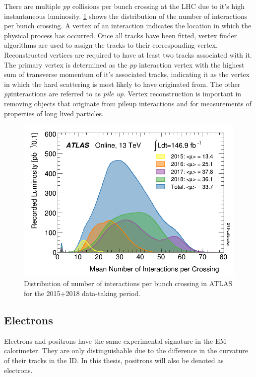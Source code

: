 There are multiple \emph{pp} collisions per bunch crossing at the LHC due to it's high instantaneous luminosity. \cref{fig:method:ATLAS-pileup} shows the distribution of the number of interactions per bunch crossing. A vertex of an interaction indicates the location in which the physical process has occurred. Once all tracks have been fitted, vertex finder algorithms are used to assign the tracks to their corresponding vertex. Reconstructed vertices are required to have at least two tracks associated with it. The primary vertex is determined as the \emph{pp} interaction vertex with the highest sum of transverse momentum of it's associated tracks, indicating it as the vertex in which the hard scattering is most likely to have originated from. The other \emph{pp}interactions are referred to as \emph{pile up}. Vertex reconstruction is important in removing objects that originate from pileup interactions and for measurements of properties of long lived particles.  
\begin{figure}[]
    \centering
    \includegraphics[width=\mediumfigwidth]{images/mu_2015_2018.png}
    \caption[Distribution of number of interactions per \protonproton bunch crossing in ATLAS for the 2015+2018 data-taking period]{Distribution of number of interactions per \protonproton bunch crossing in ATLAS for the 2015+2018 data-taking period.~\cite{ATLAS:lumiPlots}}
    \label{fig:method:ATLAS-pileup}
\end{figure}

\subsection{Electrons}\label{sec:reconstruction:electrons}
Electrons and positrons have the same experimental signature in the EM calorimeter. They are only distinguishable due to the difference in the curvature of their tracks in the ID. In this thesis, positrons will also be denoted as electrons. 

